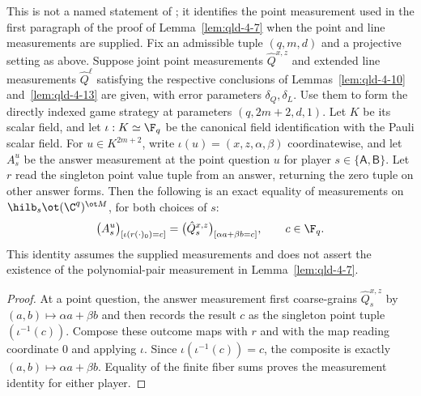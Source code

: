 \begin{lemma}
	\label{lem:qld-supplied-scalar-point-measurement}
	\leanok
	This is not a named statement of \cite{Ji2020MIPStar}; it identifies
	the point measurement used in the first paragraph of the proof of
	Lemma~\ref{lem:qld-4-7} when the point and line measurements are supplied.
	Fix an admissible tuple $(q,m,d)$ and a projective setting as above.
	Suppose joint point measurements $\hat{Q}^{x,z}$ and extended line
	measurements $\hat{Q}^{\ell}$ satisfying the respective conclusions of
	Lemmas~\ref{lem:qld-4-10} and~\ref{lem:qld-4-13} are given, with error
	parameters $\delta_Q,\delta_L$.
	Use them to form the directly indexed game strategy at parameters
	$(q,2m+2,d,1)$. Let $K$ be its scalar field, and let
	$\iota:K\simeq\F_q$ be the canonical field identification with the
	Pauli scalar field. For $u\in K^{2m+2}$, write
	$\iota(u)=(x,z,\alpha,\beta)$ coordinatewise, and let $A^u_s$ be
	the answer measurement at the point question $u$ for player
	$s\in\{\mathsf{A},\mathsf{B}\}$. Let $r$ read the singleton point
	value tuple from an answer, returning the zero tuple on other answer
	forms. Then the following is an exact equality of measurements on
	$\hilb_s\ot(\C^q)^{\ot M}$, for both choices of $s$:
	\[
		\bigl(A^u_s\bigr)_{[\iota(r(\cdot)_0)=c]}
		=\bigl(\hat{Q}^{x,z}_s\bigr)_{[\alpha a+\beta b=c]},
		\qquad c\in\F_q.
	\]
	This identity assumes the supplied measurements and does not assert
	the existence of the polynomial-pair measurement in
	Lemma~\ref{lem:qld-4-7}.
\end{lemma}
\begin{proof}
	\leanok
	At a point question, the answer measurement first coarse-grains
	$\hat{Q}^{x,z}_s$ by $(a,b)\mapsto\alpha a+\beta b$ and then records
	the result $c$ as the singleton point tuple $(\iota^{-1}(c))$.
	Compose these outcome maps with $r$ and with the map reading coordinate
	$0$ and applying $\iota$. Since $\iota(\iota^{-1}(c))=c$, the composite
	is exactly $(a,b)\mapsto\alpha a+\beta b$. Equality of the finite fiber
	sums proves the measurement identity for either player.
\end{proof}

